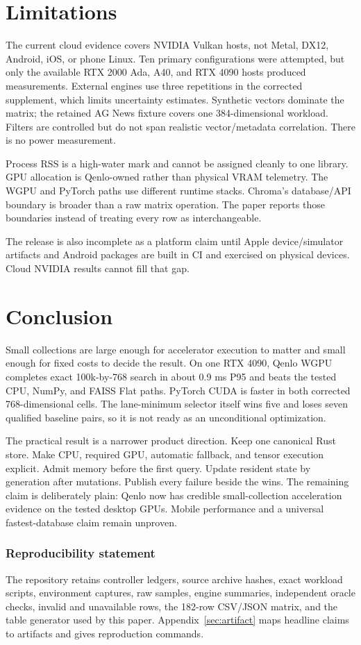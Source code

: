 \documentclass[10pt]{article}
\newcommand{\qenlo}{Qenlo}
\begin{document}
\section{Limitations}
The current cloud evidence covers NVIDIA Vulkan hosts, not Metal, DX12, Android, iOS, or phone Linux. Ten primary configurations were attempted, but only the available RTX 2000 Ada, A40, and RTX 4090 hosts produced measurements. External engines use three repetitions in the corrected supplement, which limits uncertainty estimates. Synthetic vectors dominate the matrix; the retained AG News fixture covers one 384-dimensional workload. Filters are controlled but do not span realistic vector/metadata correlation. There is no power measurement.

Process RSS is a high-water mark and cannot be assigned cleanly to one library. GPU allocation is \qenlo-owned rather than physical VRAM telemetry. The WGPU and PyTorch paths use different runtime stacks. Chroma's database/API boundary is broader than a raw matrix operation. The paper reports those boundaries instead of treating every row as interchangeable.

The release is also incomplete as a platform claim until Apple device/simulator artifacts and Android packages are built in CI and exercised on physical devices. Cloud NVIDIA results cannot fill that gap.

\section{Conclusion}
Small collections are large enough for accelerator execution to matter and small enough for fixed costs to decide the result. On one RTX 4090, \qenlo{} WGPU completes exact 100k-by-768 search in about 0.9 ms P95 and beats the tested CPU, NumPy, and FAISS Flat paths. PyTorch CUDA is faster in both corrected 768-dimensional cells. The lane-minimum selector itself wins five and loses seven qualified baseline pairs, so it is not ready as an unconditional optimization.

The practical result is a narrower product direction. Keep one canonical Rust store. Make CPU, required GPU, automatic fallback, and tensor execution explicit. Admit memory before the first query. Update resident state by generation after mutations. Publish every failure beside the wins. The remaining claim is deliberately plain: Qenlo now has credible small-collection acceleration evidence on the tested desktop GPUs. Mobile performance and a universal fastest-database claim remain unproven.

\subsubsection*{Reproducibility statement}
The repository retains controller ledgers, source archive hashes, exact workload scripts, environment captures, raw samples, engine summaries, independent oracle checks, invalid and unavailable rows, the 182-row CSV/JSON matrix, and the table generator used by this paper. Appendix~\ref{sec:artifact} maps headline claims to artifacts and gives reproduction commands.




\appendix

\end{document}
